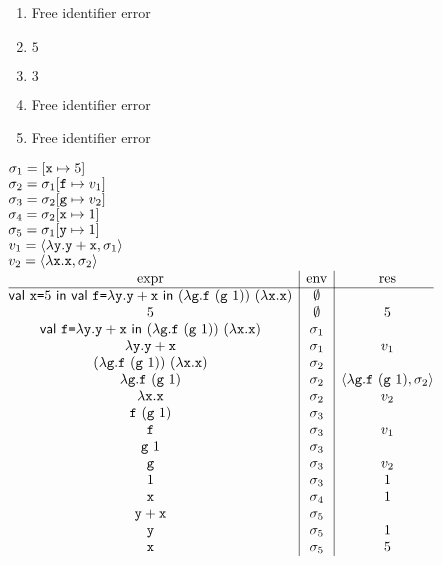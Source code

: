 \textbf{}
\begin{enumerate}
  \item Free identifier error
  \item $5$
  \item $3$
  \item Free identifier error
  \item Free identifier error
\end{enumerate}

\textbf{}

$\sigma_1=[\texttt{x}\mapsto5]$\\
$\sigma_2=\sigma_1[\texttt{f}\mapsto v_1]$\\
$\sigma_3=\sigma_2[\texttt{g}\mapsto v_2]$\\
$\sigma_4=\sigma_2[\texttt{x}\mapsto1]$\\
$\sigma_5=\sigma_1[\texttt{y}\mapsto1]$\\
$v_1=\langle\lambda\texttt{y}.\texttt{y}+\texttt{x},\sigma_1\rangle$\\
$v_2=\langle\lambda\texttt{x}.\texttt{x},\sigma_2\rangle$\\
$
\begin{array}{@{}c|c|c@{}}
  \text{expr} & \text{env} & \text{res} \\\hline
\ebind{\cx}{5}{
   \ebind{\code{f}}{\efun{\cy}{\eadd{\cy}{\cx}}}{
     \eapp{(\efun{\code{g}}{\eapp{\code{f}}{(\eapp{\code{g}}{1})}})}
       {(\efun{\cx}{\cx})}}} & \emptyset & \\
5 & \emptyset & 5 \\
\ebind{\code{f}}{\efun{\cy}{\eadd{\cy}{\cx}}}{
  \eapp{(\efun{\code{g}}{\eapp{\code{f}}{(\eapp{\code{g}}{1})}})}
    {(\efun{\cx}{\cx})}} & \sigma_1 & \\
\efun{\cy}{\eadd{\cy}{\cx}} & \sigma_1 & v_1 \\
\eapp{(\efun{\code{g}}{\eapp{\code{f}}{(\eapp{\code{g}}{1})}})}{(\efun{\cx}{\cx})} & \sigma_2 & \\
\efun{\code{g}}{\eapp{\code{f}}{(\eapp{\code{g}}{1})}} & \sigma_2 &
\clov{\code{g}}{\eapp{\code{f}}{(\eapp{\code{g}}{1})}}{\sigma_2} \\
\efun{\cx}{\cx} & \sigma_2 & v_2 \\
\eapp{\code{f}}{(\eapp{\code{g}}{1})} & \sigma_3 & \\
\cf & \sigma_3 & v_1 \\
\eapp{\code{g}}{1} & \sigma_3 \\
\code{g} & \sigma_3 & v_2 \\
1 & \sigma_3 & 1 \\
\cx & \sigma_4 & 1 \\
\eadd{\cy}{\cx} & \sigma_5 \\
\cy & \sigma_5 & 1 \\
\cx & \sigma_5 & 5 \\
\end{array}
$
\\

